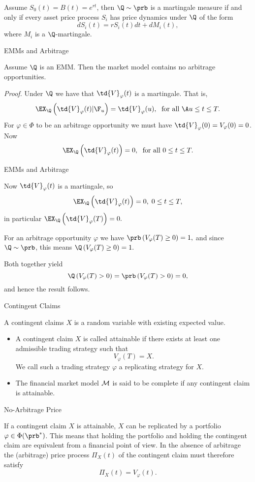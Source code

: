 Assume $S_0(t) = B(t) = e^{rt}$, then $\Q \sim \prb$ is a
martingale measure if and only if every asset price process $S_i$
has price dynamics under $\Q$ of the form
$$
dS_i(t) = r S_i(t) dt + dM_i(t),
$$
where $M_i$ is a $\Q$-martingale.

{ EMMs and Arbitrage}

Assume $\Q$ is an EMM. Then the market model contains no arbitrage
opportunities.

{\it Proof.} Under $\Q$ we have that $\td{V}_\varphi(t)$ is a
martingale. That is,
$$
\EX_{\Q}\left(\td{V}_\varphi(t)|\F_u\right) = \td{V}_\varphi(u),\;
\mbox{ for all }\A u \leq t \leq T.
$$
For $\varphi \in \Phi$ to be an arbitrage opportunity we must have
$\td{V}_\varphi(0) =V_\varphi(0)= 0$.  Now
$$
\EX_{\Q}\left(\td{V}_\varphi(t)\right) = 0,\; \mbox{ for all } 0
\leq t \leq T.
$$

{ EMMs and Arbitrage}

Now $\td{V}_\varphi(t)$ is a martingale, so
$$
\EX_{\Q}\left(\td{V}_\varphi(t)\right) = 0,\; 0 \leq t \leq T,
$$
in particular $ \EX_{\Q}\left(\td{V}_\varphi(T)\right) = 0. $

For an arbitrage opportunity $\varphi$ we have $
\prb\left(V_\varphi(T) \geq 0\right) =1, $ and since $\Q \sim
\prb$, this means $ \Q\left(V_\varphi(T) \geq 0\right) =1. $

Both together yield
$$
\Q\left(V_\varphi(T) > 0\right) = \prb\left(V_\varphi(T) >
0\right) =0,
$$
and hence the result follows.\hfill \eb

{ Contingent Claims}

A contingent claims $X$ is a random variable with existing expected value.
\begin{itemize}
\item<1-> A contingent claim $X$ is called attainable if there
exists at least one admissible trading strategy such that
$$
V_\varphi(T) = X.
$$
We call such a  trading strategy $\varphi$ a replicating strategy
for $X$. \item<2-> The financial market model ${\cal M}$ is said
to be complete if any contingent claim is attainable.

\end{itemize}

{ No-Arbitrage Price}

If a contingent claim $X$ is attainable, $X$ can be replicated by
a portfolio $\varphi \in \Phi(\prb^*)$. This means that holding
the portfolio and holding the contingent claim are equivalent from
a financial point of view. In the absence of arbitrage the
(arbitrage) price process $\Pi_X(t)$ of the contingent claim must
therefore satisfy
$$
\Pi_X(t) = V_\varphi(t).
$$

